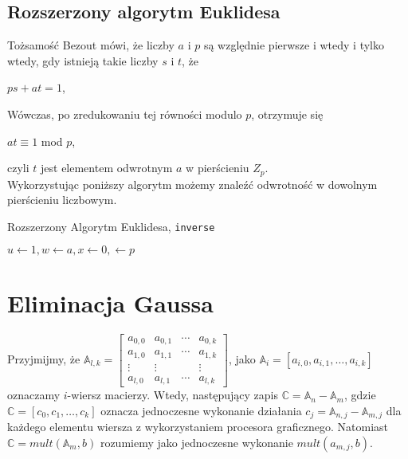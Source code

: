 \documentclass[]{article}
\begin{document}
	\subsection{Rozszerzony algorytm Euklidesa}
		Tożsamość Bezout mówi, że liczby $a$ i $p$ są względnie pierwsze i wtedy i tylko wtedy, gdy istnieją takie liczby $s$ i $t$, że
		\begin{center}
			$ps + at = 1$,
		\end{center}
		Wówczas, po zredukowaniu tej równości modulo $p$, otrzymuje się
		\begin{center}
			$at \equiv 1$ mod $p$,
		\end{center}
		 czyli $t$ jest elementem odwrotnym $a$ w pierścieniu $Z_{p}$. \\
		Wykorzystując poniższy algorytm możemy znaleźć odwrotność w dowolnym pierścieniu liczbowym.
		
		\begin{algorithm}[H]
			\label{extEuklid}
			\caption{Rozszerzony Algorytm Euklidesa, \texttt{inverse}}
			\BlankLine
			$u \leftarrow 1, w \leftarrow a, x \leftarrow 0, \leftarrow p$ \\
		\end{algorithm}
	\section{Eliminacja Gaussa}
		Przyjmijmy, że 
		\newline
		\(\mathbb{A}_{l,k} = 
		\begin{bmatrix}
			a_{0,0} & a_{0,1} & \cdots & a_{0,k} \\
			a_{1,0} & a_{1,1} & \cdots & a_{1,k} \\
			\vdots & \vdots & & \vdots \\
			a_{l,0} & a_{l,1} & \cdots & a_{l,k} 
		\end{bmatrix} \), 
		\newline
		jako \(\mathbb{A}_i = [a_{i,0}, a_{i,1}, \dots, a_{i,k}]\) oznaczamy \(i\)-wiersz macierzy. Wtedy, następujący zapis \(\mathbb{C} = \mathbb{A}_n - \mathbb{A}_m\), gdzie \(\mathbb{C} = [c_0, c_1, \dots, c_k]\) oznacza jednoczesne wykonanie działania \(c_j = \mathbb{A}_{n,j} - \mathbb{A}_{m,j}\) dla każdego elementu wiersza z wykorzystaniem procesora graficznego. Natomiast \(\mathbb{C} = mult(\mathbb{A}_m, b)\) rozumiemy jako jednoczesne wykonanie \(mult(a_{m,j}, b)\). 
		
\end{document}

